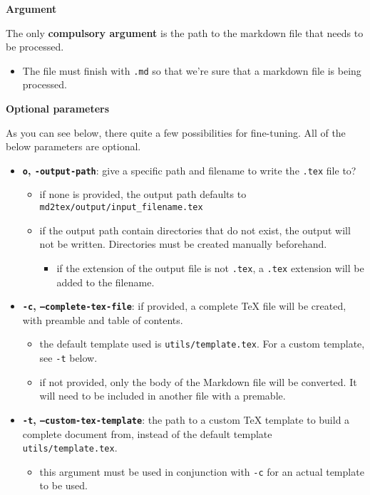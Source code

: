 \documentclass[a4paper, 12pt, twoside]{article}
\begin{document}
\noindent{}\textbf{Argument}

The only \textbf{compulsory argument} is the path to the markdown file that needs to be processed.

\begin{itemize}
\item The file must finish with \texttt{.md} so that we're sure that a markdown file is being processed. 
\end{itemize}

\noindent{}\textbf{Optional parameters}

As you can see below, there quite a few possibilities for fine-tuning. All of the below
parameters are optional.

\begin{itemize}
\item \textbf{\texttt{o}, \texttt{-output-path}}: give a specific path and filename to write the \texttt{.tex} file to?
\begin{itemize} 
 \item if none is provided, the output path defaults to \texttt{md2tex/output/input\_filename.tex}
\item if the output path contain directories that do not exist, the output will not be 	 written. Directories must be created manually beforehand.
\begin{itemize} 
 \item if the extension of the output file is not \texttt{.tex}, a \texttt{.tex} extension will be added to the filename.
\end{itemize}
\end{itemize}
\item \textbf{\texttt{-c}, \texttt{--complete-tex-file}}: if provided, a complete TeX file will be created, with preamble and table of contents. 
\begin{itemize} 
 \item the default template used is \texttt{utils/template.tex}. For a custom template, see \texttt{-t} below.
\item if not provided, only the body of the Markdown file will be converted. It will need to be included 	 in another file with a premable.
\end{itemize}
\item \textbf{\texttt{-t}, \texttt{--custom-tex-template}}: the path to a custom TeX template to build a complete document from, instead of the default template \texttt{utils/template.tex}.
\begin{itemize} 
 \item this argument must be used in conjunction with \texttt{-c} for an actual template to be used.

\end{itemize}
\end{itemize}
\end{document}
